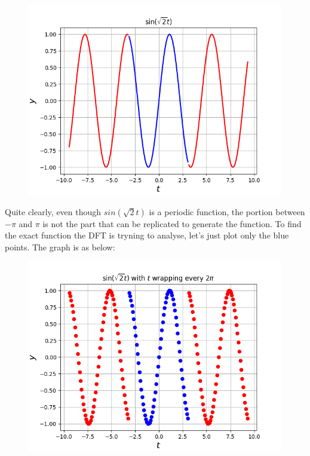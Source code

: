 \documentclass[11pt, a4paper]{article}
\begin{document}
\begin{figure}[!tbh]
\centering
\includegraphics[scale=0.6]{assgn10_plot2.png} 
\label{fig2}
\end{figure} 

Quite clearly, even though $sin(\sqrt{2}t)$ is a periodic function, the portion between $-\pi$ and $\pi$ is not the part that can be replicated to generate the function. To find the exact function the DFT is tryning to analyse, let's just plot only the blue points. The graph is as below:

\begin{figure}[!tbh]
\centering
\includegraphics[scale=0.55]{assgn10_plot3.png} 
\label{fig3}
\end{figure} 
\end{document}
